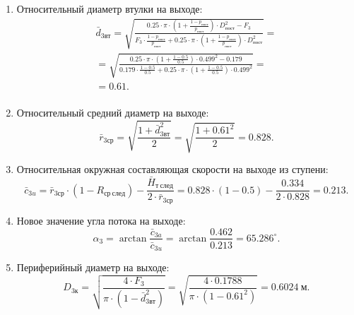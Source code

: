 \documentclass[a4paper,10pt]{article}
\begin{document}
\begin{enumerate}
\begin{enumerate}
            \item Относительный диаметр втулки на выходе:
            \begin{gather*}
                \bar{d}_{3вт} = \sqrt{ \frac{ 
                                0.25 \cdot \pi \cdot \left( 
                                    1 + \frac{ 1 - p_{пост} }{ p_{пост} } 
                                \right) \cdot D_{пост}^2 - F_3
                        }{ 
                            F_3 \cdot \frac{ 1 - p_{пост} }{ p_{пост} } + 0.25 \cdot \pi \cdot \left( 
                                    1 + \frac{ 1 - p_{пост} }{ p_{пост} } 
                                \right) \cdot D_{пост}^2
                    } } =\\ 
                =\sqrt{ \frac{ 
                                0.25 \cdot \pi \cdot \left( 
                                    1 + \frac{ 1 - 0.5 }{ 0.5 } 
                                \right) \cdot 0.499^2 - 0.179
                        }{ 
                            0.179 \cdot 
                            \frac{ 1 - 0.5 }{ 0.5 } 
                            + 0.25 \cdot \pi \cdot \left( 
                                    1 + \frac{ 1 - 0.5 }{ 0.5 } 
                            \right) \cdot 0.499^2
                    } } =\\ 
                = 0.61.\\
            \end{gather*}

            \item Относительный средний диаметр на выходе:
            \[
                \bar{r}_{3ср} = \sqrt{ \frac{ 1 + \bar{d}_{3вт}^2 }{ 2 } } = 
                \sqrt{ \frac{ 1 + 0.61 ^ 2 }{ 2 } } = 
                0.828.
            \]

            \item Относительная окружная составляющая скорости на выходе из ступени:
            \[
                \bar{c}_{3u} = \bar{r}_{3ср} \cdot (1 - R_{ср\ след}) - \frac{ \bar{H}_{т\ след} }{ 2 \cdot  \bar{r}_{3ср}} = 
                0.828 \cdot (1 - 0.5) -
                \frac{ 0.334 }{ 2 \cdot  0.828} =
                0.213. 
            \]

            \item Новое значение угла потока на выходе:
            \[
                \alpha_3 = \arctan{ \frac{ \bar{c}_{3a} }{ \bar{c}_{3u} } } = 
                \arctan{ \frac{ 0.462 }{ 0.213 } } = 
                65.286^\circ.
            \]

            \item Периферийный диаметр на выходе:
            \[
                D_{3к} = \sqrt{ \frac{ 4 \cdot F_3 }{ \pi \cdot (1 - \bar{d}_{3вт}^2) } } = 
                \sqrt{ \frac{ 
                        4 \cdot 0.1788 
                    }{ 
                        \pi \cdot (1 - 0.61^2) 
                } } = 
                0.6024\ м.
            \]


\end{enumerate}
\end{enumerate}
\end{document}
